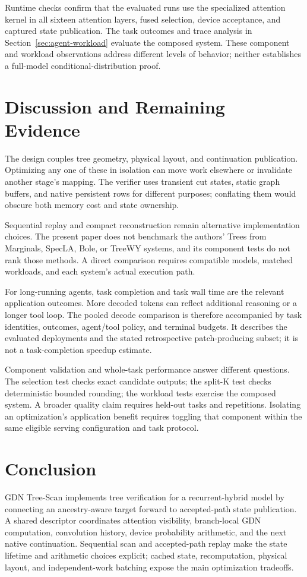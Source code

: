 \documentclass[conference]{IEEEtran}
\newcommand{\sys}{GDN Tree-Scan}
\begin{document}
Runtime checks confirm that the evaluated runs use the specialized attention kernel in all sixteen attention layers, fused selection, device acceptance, and captured state publication. The task outcomes and trace analysis in Section~\ref{sec:agent-workload} evaluate the composed system. These component and workload observations address different levels of behavior; neither establishes a full-model conditional-distribution proof.

\section{Discussion and Remaining Evidence}
\label{sec:planned}
The design couples tree geometry, physical layout, and continuation publication. Optimizing any one of these in isolation can move work elsewhere or invalidate another stage's mapping. The verifier uses transient cut states, static graph buffers, and native persistent rows for different purposes; conflating them would obscure both memory cost and state ownership.

Sequential replay and compact reconstruction remain alternative implementation choices. The present paper does not benchmark the authors' Trees from Marginals, SpecLA, Bole, or TreeWY systems, and its component tests do not rank those methods. A direct comparison requires compatible models, matched workloads, and each system's actual execution path.

For long-running agents, task completion and task wall time are the relevant application outcomes. More decoded tokens can reflect additional reasoning or a longer tool loop. The pooled decode comparison is therefore accompanied by task identities, outcomes, agent/tool policy, and terminal budgets. It describes the evaluated deployments and the stated retrospective patch-producing subset; it is not a task-completion speedup estimate.

Component validation and whole-task performance answer different questions. The selection test checks exact candidate outputs; the split-K test checks deterministic bounded rounding; the workload tests exercise the composed system. A broader quality claim requires held-out tasks and repetitions. Isolating an optimization's application benefit requires toggling that component within the same eligible serving configuration and task protocol.

\section{Conclusion}
\sys{} implements tree verification for a recurrent-hybrid model by connecting an ancestry-aware target forward to accepted-path state publication. A shared descriptor coordinates attention visibility, branch-local GDN computation, convolution history, device probability arithmetic, and the next native continuation. Sequential scan and accepted-path replay make the state lifetime and arithmetic choices explicit; cached state, recomputation, physical layout, and independent-work batching expose the main optimization tradeoffs.
\end{document}

